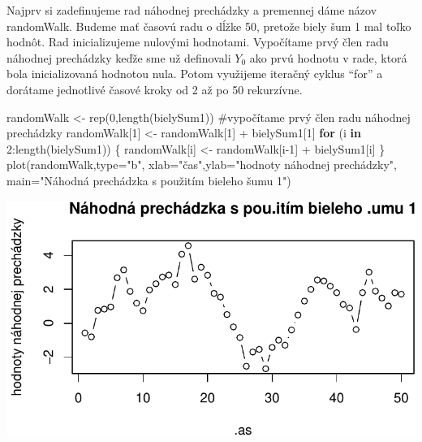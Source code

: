 \documentclass[
  letterpaper,
  DIV=11,
  numbers=noendperiod]{scrreprt}
\newenvironment{Shaded}{\begin{snugshade}}{\end{snugshade}}
\newcommand{\AttributeTok}[1]{\textcolor[rgb]{0.40,0.45,0.13}{#1}}
\newcommand{\CommentTok}[1]{\textcolor[rgb]{0.37,0.37,0.37}{#1}}
\newcommand{\ControlFlowTok}[1]{\textcolor[rgb]{0.00,0.23,0.31}{\textbf{#1}}}
\newcommand{\DecValTok}[1]{\textcolor[rgb]{0.68,0.00,0.00}{#1}}
\newcommand{\FunctionTok}[1]{\textcolor[rgb]{0.28,0.35,0.67}{#1}}
\newcommand{\NormalTok}[1]{\textcolor[rgb]{0.00,0.23,0.31}{#1}}
\newcommand{\OtherTok}[1]{\textcolor[rgb]{0.00,0.23,0.31}{#1}}
\newcommand{\SpecialCharTok}[1]{\textcolor[rgb]{0.37,0.37,0.37}{#1}}
\newcommand{\StringTok}[1]{\textcolor[rgb]{0.13,0.47,0.30}{#1}}
\begin{document}
Najprv si zadefinujeme rad náhodnej prechádzky a premennej dáme názov
randomWalk. Budeme mať časovú radu o dĺžke 50, pretože biely šum 1 mal
toľko hodnôt. Rad inicializujeme nulovými hodnotami. Vypočítame prvý
člen radu náhodnej prechádzky keďže sme už definovali \(Y_0\) ako prvú
hodnotu v rade, ktorá bola inicializovaná hodnotou nula. Potom využijeme
iteračný cyklus ``for'' a dorátame jednotlivé časové kroky od 2 až po 50
rekurzívne.

\begin{Shaded}
\begin{Highlighting}[]
\NormalTok{randomWalk }\OtherTok{\textless{}{-}} \FunctionTok{rep}\NormalTok{(}\DecValTok{0}\NormalTok{,}\FunctionTok{length}\NormalTok{(bielySum1))}
\CommentTok{\#vypočítame prvý člen radu náhodnej prechádzky  }
\NormalTok{randomWalk[}\DecValTok{1}\NormalTok{] }\OtherTok{\textless{}{-}}\NormalTok{ randomWalk[}\DecValTok{1}\NormalTok{] }\SpecialCharTok{+}\NormalTok{ bielySum1[}\DecValTok{1}\NormalTok{]}
\ControlFlowTok{for}\NormalTok{ (i }\ControlFlowTok{in} \DecValTok{2}\SpecialCharTok{:}\FunctionTok{length}\NormalTok{(bielySum1)) \{}
\NormalTok{    randomWalk[i] }\OtherTok{\textless{}{-}}\NormalTok{ randomWalk[i}\DecValTok{{-}1}\NormalTok{] }\SpecialCharTok{+}\NormalTok{ bielySum1[i]}
\NormalTok{\}}
\FunctionTok{plot}\NormalTok{(randomWalk,}\AttributeTok{type=}\StringTok{"b"}\NormalTok{, }\AttributeTok{xlab=}\StringTok{"čas"}\NormalTok{,}\AttributeTok{ylab=}\StringTok{"hodnoty náhodnej prechádzky"}\NormalTok{, }\AttributeTok{main=}\StringTok{"Náhodná prechádzka s použitím bieleho šumu 1"}\NormalTok{)}
\end{Highlighting}
\end{Shaded}

\includegraphics{prednaska3_NahodnaPrechadzkaStacionarita_files/figure-pdf/unnamed-chunk-6-1.pdf}
\end{document}
